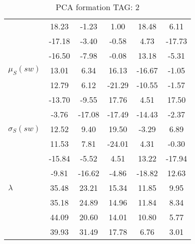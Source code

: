 \begin{table}[h!]
\begin{center}
\begin{tabular}{| l || c | c | c | c | c |}
 & 18.23  & -1.23  & 1.00  & 18.48  & 6.11 \\
 & -17.18  & -3.40  & -0.58  & 4.73  & -17.73 \\
 & -16.50  & -7.98  & -0.08  & 13.18  & -5.31 \\\hline
$\mu_S(sw)$ & 13.01  & 6.34  & 16.13  & -16.67  & -1.05 \\
 & 12.79  & 6.12  & -21.29  & -10.55  & -1.57 \\
 & -13.70  & -9.55  & 17.76  & 4.51  & 17.50 \\
 & -3.76  & -17.08  & -17.49  & -14.43  & -2.37 \\\hline
$\sigma_S(sw)$ & 12.52  & 9.40  & 19.50  & -3.29  & 6.89 \\
 & 11.53  & 7.81  & -24.01  & 4.31  & -0.30 \\
 & -15.84  & -5.52  & 4.51  & 13.22  & -17.94 \\
 & -9.81  & -16.62  & -4.86  & -18.82  & 12.63 \\\hline\hline
$\lambda$ & 35.48  & 23.21  & 15.34  & 11.85  & 9.95 \\
 & 35.18  & 24.89  & 14.96  & 11.84  & 8.34 \\
 & 44.09  & 20.60  & 14.01  & 10.80  & 5.77 \\
 & 39.93  & 31.49  & 17.78  & 6.76  & 3.01 \\\hline
\end{tabular}
\caption{PCA formation TAG: 2}
\end{center}
\end{table}